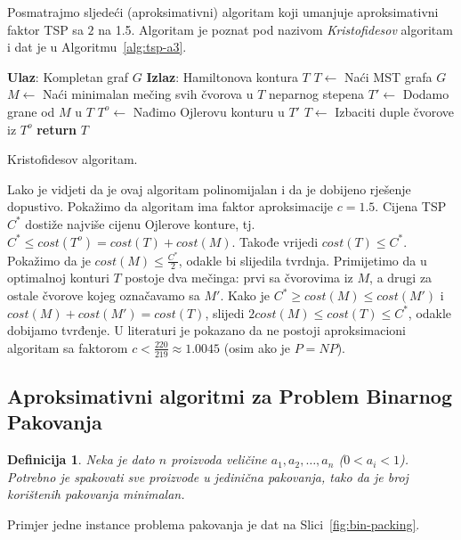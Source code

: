 \documentclass[a4paper, utf8, 11pt, colorlinks]{book}
\newtheorem{definition}{Definicija}
\begin{document}
Posmatrajmo sljedeći (aproksimativni) algoritam koji umanjuje aproksimativni faktor TSP sa $2$ na 1.5. Algoritam je poznat pod nazivom \emph{Kristofidesov} algoritam i dat je u Algoritmu~\ref{alg:tsp-a3}.

\begin{algorithm}[H] 

	\begin{algorithmic}[1]
		\STATE \textbf{Ulaz}: Kompletan graf $G$
		\STATE \textbf{Izlaz}: Hamiltonova kontura $T$ 
		\STATE $T \gets$ Naći MST grafa $G$
		\STATE $M \gets$ Naći minimalan mečing svih čvorova u $T$ neparnog stepena
		\STATE $T' \gets$ Dodamo grane od $M$ u $T$
		\STATE $T^o\gets$ Nađimo Ojlerovu konturu u $T'$
		\STATE $T \gets$ Izbaciti duple čvorove iz $T^o$
		\STATE \textbf{return} $T$
	\end{algorithmic}	
    \caption{Kristofidesov algoritam.}
    \label{alg:tsp-a3}
\end{algorithm}
  Lako je vidjeti da je ovaj algoritam polinomijalan i da je dobijeno rješenje dopustivo.
 Pokažimo da algoritam ima faktor aproksimacije $c=1.5$.  Cijena TSP $C^*$ dostiže najviše cijenu Ojlerove konture, tj.  $C^*\leq cost(T^o) = cost(T) + cost(M)$.  Takođe vrijedi $cost(T) \leq C^*$. Pokažimo da je $cost(M) \leq  \frac{C^*}{2}$, odakle bi slijedila tvrdnja. Primijetimo da u optimalnoj konturi $T$ postoje dva mečinga: prvi sa čvorovima iz $M$, a drugi za ostale čvorove kojeg označavamo sa $M'$. 
 Kako je $C^* \geq cost(M) \leq cost(M')$ i $cost(M) + cost(M') = cost(T)$, slijedi 
 $2 cost(M) \leq cost(T) \leq C^*$, odakle dobijamo tvrđenje.  U literaturi je pokazano da ne postoji  aproksimacioni algoritam sa faktorom  $c < \frac{220}{219} \approx 1.0045$ (osim ako je $P=NP$). 
 
 
 \subsection{Aproksimativni algoritmi za Problem Binarnog Pakovanja}

\begin{definition}
    Neka je dato $n$ proizvoda veličine $a_1,a_2,\ldots,a_n$ ($0<a_i<1$). Potrebno je spakovati sve proizvode u jedinična pakovanja, tako da je broj korištenih pakovanja minimalan.  
\end{definition} 

  Primjer jedne instance problema pakovanja je dat na Slici~\ref{fig:bin-packing}.
\end{document}
